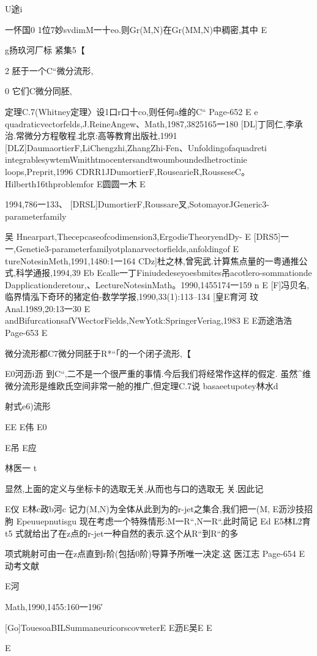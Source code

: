 U途i

一怀国0
1位7妙svdimM一十eo.则Gr(M,N)在Gr(MM,N)中稠密,其中
E

g扬玖河厂标
紧集5【

2
胚于一个C“微分流形,

0
它们C微分同胚,

定理C.7(Whitney定理〉设1口r口十co,则任何a维的C“
Page-652
E
e
quadraticvectorfelds,J.ReineAngew、Math,1987,3825165一180
[DL]丁同仁,李承治.常微分方程敬程.北京:高等教育出版社,1991
[DLZ]DaumaortierF,LiChengzhi,ZhangZhi-Fen、Unfoldingofaquadreti
integrablesywtemWmithtmocentersandtwoumboundedhetroctinie
loops,Preprit,1996
CDRR1JDumortierF,RousearieR,RousseseC。Hilberth16thproblemfor
E圆圆一木
E

1994,786一133、
[DRSL]DumortierF,Roussare叉,SotomayorJGeneric3-parameterfamily

吴
Hnearpart,Thecepcaseofcodimension3,ErgodieTheoryendDy-
E
[DRS5]一一,Genetie3-parameterfamilyotplanarvectorfields,anfoldingof
E
tureNotesinMeth,1991,1480:1一164
CDz]杜之林,曾宪武.计算焦点量的一粤通推公式,科学通报,1994,39
Eb
Ecalle一丁Finiudedeseyoesbmites吊acotlero-sommationde
Dapplicationderetour,、LectureNotesinMath。1990,1455174一159
n
E
[F]冯贝名,临界情泓下奇环的猪定伯-数学学报,1990,33(1):113--134
[皇E育河
玟
Anal.1989,20:13一30
E
andBifurcationsafVWectorFields,NewYotk:SpringerVeriag,1983
E
E沥途浩浩
Page-653
E

微分流形都C7微分同胚于R*“「的一个闭子流形,【

E0河沥i沥
到C“,二不是一个很严重的事情.今后我们将经常作这样的假定.
虽然^维微分流形是维欧氏空间非常一舱的推广,但定理C.7说
basaeetupotey林水d

射式e6)流形

EE
E伟
E0

E吊
E应

林医一
t

显然,上面的定义与坐标卡的选取无关,从而也与口的选取无
关.因此记

E仪
E林c政b河c
记力(M,N)为全体从此到为的r-jet之集合,我们把一(M,
E沥沙技招朐
Epeuuepnutisgu
现在考虑一个特殊情形:M一R“,N一R“.此时简记
Ed
E5林L2育t5
式就给出了在z点的r-jet一种自然的表示.这个从R“到R“的多

项式眺射可由一在z点直到r阶(包括0阶)导算予所唯一决定.这
医江志
Page-654
E动考文献

E河

Math,1990,1455:160一196′

[Go]TouesoaBILSummaneuricorscovweterE
E沥E吴E
E

E

